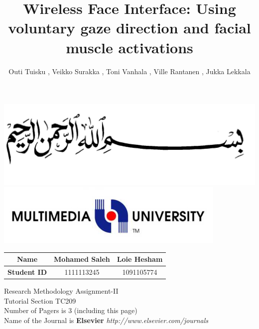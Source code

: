 \documentclass[a4paper]{article}
\begin{document}
\begin{center}
\includegraphics[scale=0.2]{besm.jpg}\\

\includegraphics[scale=1.5]{mmulogo.png}\\ 
\end{center} 
\nopagebreak[3]

\begin{flushleft}
\begin{tabular}{|c| c| c|}
\hline
\large \bf Name & \large Mohamed Saleh & \large Loie Hesham \\
\hline
\large \bf Student ID & \large 1111113245 & \large 1091105774 \\
\hline
\end{tabular}  \newline \newline \newline 

{\Large Research Methodology Assignment-II \\
Tutorial Section TC209 \\
Number of Pagers is 3 (including this page) \\
Name of the Journal is {\bf Elsevier} {\it http://www.elsevier.com/journals} } \newline \newline \newline 
\end{flushleft} 

\tableofcontents


\title{Wireless Face Interface: Using voluntary gaze direction and facial muscle activations}
\author{ Outi Tuisku , Veikko Surakka , Toni Vanhala , Ville Rantanen , Jukka Lekkala}
\end{document}
